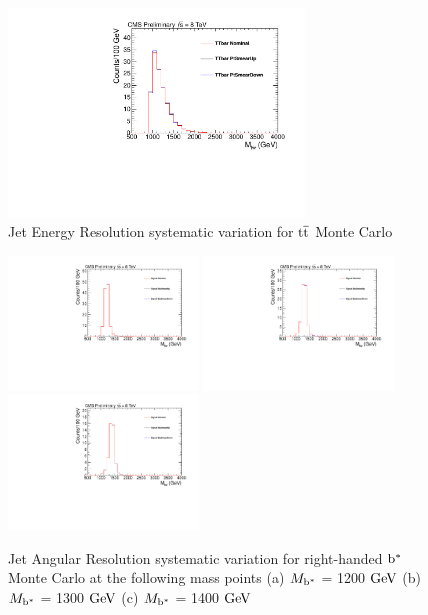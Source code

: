 \begin{figure}[htcb]
\begin{center}
\includegraphics[width=0.7\textwidth]{AN-14-049/figs/TTbar_PtSmearing}
\caption{Jet Energy Resolution systematic variation for $\mathrm{t\overline{t}}$ Monte Carlo}
\label{figs:bsttbarJER}
\end{center}
\end{figure}

\begin{figure}[htcb]
\begin{center}
\includegraphics[width=0.45\textwidth]{AN-14-049/figs/Signal_M1200_EtaScaling}
\includegraphics[width=0.45\textwidth]{AN-14-049/figs/Signal_M1300_EtaScaling}
\includegraphics[width=0.45\textwidth]{AN-14-049/figs/Signal_M1400_EtaScaling}
\caption{
Jet Angular Resolution systematic variation for right-handed $\mathrm{b}^{*}$  Monte Carlo at the following mass points
(a) $M_{\mathrm{b}^{*}}$ = 1200$~\mathrm{GeV}$ 
(b) $M_{\mathrm{b}^{*}}$ = 1300$~\mathrm{GeV}$
(c) $M_{\mathrm{b}^{*}}$ = 1400$~\mathrm{GeV}$ 
}
\label{figs:bssignalJAR}
\end{center}
\end{figure}

